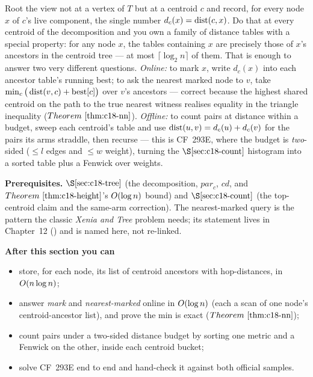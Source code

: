 \begin{topicintro}
Root the view not at a vertex of \(T\) but at a centroid \(c\) and record, for every
node \(x\) of \(c\)'s live component, the single number \(d_c(x)=\operatorname{dist}(c,x)\). Do that
at every centroid of the decomposition and you own a family of distance tables with a
special property: for any node \(x\), the tables containing \(x\) are precisely those of
\(x\)'s ancestors in the centroid tree --- at most \(\lceil\log_2 n\rceil\) of them.
That is enough to answer two very different questions. \emph{Online:} to mark \(x\),
write \(d_c(x)\) into each ancestor table's running best; to ask the nearest marked node
to \(v\), take \(\min_c\big(\operatorname{dist}(v,c)+\text{best}[c]\big)\) over \(v\)'s ancestors ---
correct because the highest shared centroid on the path to the true nearest witness
realises equality in the triangle inequality (\(\thmref{c18-nn}\)). \emph{Offline:} to
count pairs at distance within a budget, sweep each centroid's table and use
\(\operatorname{dist}(u,v)=d_c(u)+d_c(v)\) for the pairs its arms straddle, then recurse --- this is
CF~293E, where the budget is \emph{two}-sided (\(\le l\) edges and \(\le w\) weight),
turning the \(\secref{c18-count}\) histogram into a sorted table plus a Fenwick over
weights.

\textbf{Prerequisites.} \(\secref{c18-tree}\) (the decomposition, \(\mathit{par}_c\),
\(\mathit{cd}\), and \(\thmref{c18-height}\)'s \(O(\log n)\) bound) and
\(\secref{c18-count}\) (the top-centroid claim and the same-arm correction). The
nearest-marked query is the pattern the classic \emph{Xenia and Tree} problem needs; its
statement lives in Chapter~12 () and is named here, not re-linked.

\textbf{After this section you can}
\begin{itemize}[nosep]
  \item store, for each node, its list of centroid ancestors with hop-distances, in \(O(n\log n)\); \hfill{}
  \item answer \emph{mark} and \emph{nearest-marked} online in \(O(\log n)\) (each a
        scan of one node's centroid-ancestor list), and prove the min is exact (\(\thmref{c18-nn}\)); \hfill{}
  \item count pairs under a two-sided distance budget by sorting one metric and a Fenwick
        on the other, inside each centroid bucket; \hfill{}
  \item solve CF~293E end to end and hand-check it against both official samples. \hfill{}
\end{itemize}
\end{topicintro}


